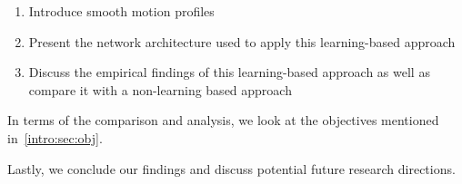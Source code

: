 \begin{enumerate}
\item Introduce smooth motion profiles
\item Present the network architecture used to apply this learning-based approach
\item Discuss the empirical findings of this learning-based approach as well as compare it with a non-learning based approach
\end{enumerate}

In terms of the comparison and analysis, we look at the objectives mentioned in~\autoref{intro:sec:obj}.

Lastly, we conclude our findings and discuss potential future research directions.